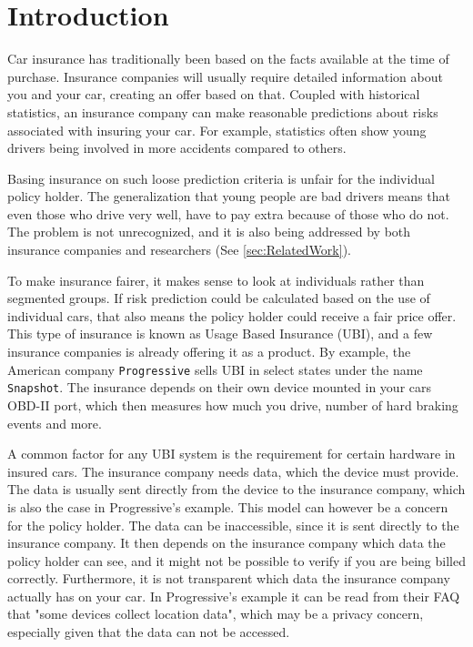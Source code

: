 \chapter{Introduction}
\label{chap:intro}

Car insurance has traditionally been based on the facts available at the time of purchase. Insurance companies will usually require detailed information about you and your car, creating an offer based on that. Coupled with historical statistics, an insurance company can make reasonable predictions about risks associated with insuring your car. For example, statistics often show young drivers being involved in more accidents compared to others\cite{accidents}.

Basing insurance on such loose prediction criteria is unfair for the individual policy holder. The generalization that young people are bad drivers means that even those who drive very well, have to pay extra because of those who do not. The problem is not unrecognized, and it is also being addressed by both insurance companies and researchers (See \ref{sec:RelatedWork}).

To make insurance fairer, it makes sense to look at individuals rather than segmented groups. If risk prediction could be calculated based on the use of individual cars, that also means the policy holder could receive a fair price offer. This type of insurance is known as Usage Based Insurance (UBI), and a few insurance companies is already offering it as a product. By example, the American company \texttt{Progressive} sells UBI in select states under the name \texttt{Snapshot}\cite{snapshot}. The insurance depends on their own device mounted in your cars OBD-II port, which then measures how much you drive, number of hard braking events and more.

A common factor for any UBI system is the requirement for certain hardware in insured cars. The insurance company needs data, which the device must provide. The data is usually sent directly from the device to the insurance company, which is also the case in Progressive's example. This model can however be a concern for the policy holder. The data can be inaccessible, since it is sent directly to the insurance company. It then depends on the insurance company which data the policy holder can see, and it might not be possible to verify if you are being billed correctly. Furthermore, it is not transparent which data the insurance company actually has on your car. In Progressive's example it can be read from their FAQ that "some devices collect location data", which may be a privacy concern, especially given that the data can not be accessed.

